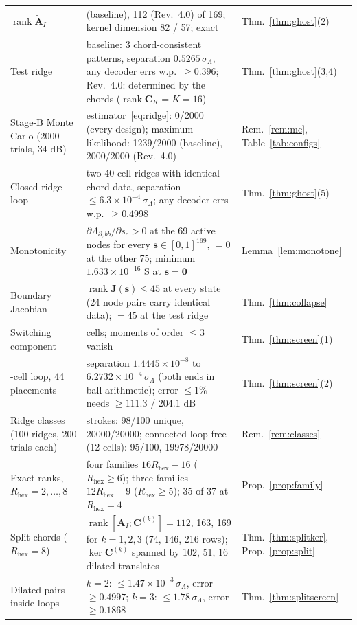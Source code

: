 \documentclass[11pt,a4paper]{article}
\theoremstyle{definition}
\theoremstyle{remark}
\begin{document}
\begin{table}[!p]
\begin{tabularx}{\textwidth}{@{}>{\raggedright\arraybackslash}p{3.6cm}>{\raggedright\arraybackslash}X>{\raggedright\arraybackslash}p{2.6cm}@{}}
$\operatorname{rank}\widetilde{\mathbf{A}}_I$ & 87 (baseline), 112 (Rev.~4.0) of 169; kernel dimension 82 / 57; exact & Thm.~\ref{thm:ghost}(2) \\
Test ridge & baseline: 3 chord-consistent patterns, separation $0.5265\,\sigma_\Lambda$, any decoder errs w.p.\ $\ge 0.396$; Rev.~4.0: determined by the chords ($\operatorname{rank}\mathbf{C}_K = K = 16$) & Thm.~\ref{thm:ghost}(3,4) \\
Stage-B Monte Carlo (2000 trials, 34 dB) & estimator~\eqref{eq:ridge}: 0/2000 (every design); maximum likelihood: 1239/2000 (baseline), 2000/2000 (Rev.~4.0) & Rem.~\ref{rem:mc}, Table~\ref{tab:configs} \\
Closed ridge loop & two 40-cell ridges with identical chord data, separation $\le 6.3\times10^{-4}\,\sigma_\Lambda$; any decoder errs w.p.\ $\ge 0.4998$ & Thm.~\ref{thm:ghost}(5) \\
Monotonicity & $\partial\Lambda_{\partial,bb}/\partial s_c>0$ at the 69 active nodes for every $\mathbf{s}\in[0,1]^{169}$, $=0$ at the other 75; minimum $1.633\times10^{-16}$ S at $\mathbf{s}=\mathbf{0}$ & Lemma~\ref{lem:monotone} \\
Boundary Jacobian & $\operatorname{rank}\mathbf{J}(\mathbf{s})\le45$ at every state (24 node pairs carry identical data); $=45$ at the test ridge & Thm.~\ref{thm:collapse} \\
Switching component & 8 cells; moments of order $\le3$ vanish & Thm.~\ref{thm:screen}(1) \\
36-cell loop, 44 placements & separation $1.4445\times10^{-8}$ to $6.2732\times10^{-4}\,\sigma_\Lambda$ (both ends in ball arithmetic); error $\le1\%$ needs $\ge111.3$ / $204.1$ dB & Thm.~\ref{thm:screen}(2) \\
Ridge classes (100 ridges, 200 trials each) & strokes: 98/100 unique, 20000/20000; connected loop-free (12 cells): 95/100, 19978/20000 & Rem.~\ref{rem:classes} \\
Exact ranks, $R_{\text{hex}}=2,\dots,8$ & four families $16R_{\text{hex}}-16$ ($R_{\text{hex}}\ge6$); three families $12R_{\text{hex}}-9$ ($R_{\text{hex}}\ge5$); 35 of 37 at $R_{\text{hex}}=4$ & Prop.~\ref{prop:family} \\
Split chords ($R_{\text{hex}}=8$) & $\operatorname{rank}[\mathbf{A}_I;\mathbf{C}^{(k)}] = 112$, 163, 169 for $k=1,2,3$ (74, 146, 216 rows); $\ker\mathbf{C}^{(k)}$ spanned by 102, 51, 16 dilated translates & Thm.~\ref{thm:splitker}, Prop.~\ref{prop:split} \\
Dilated pairs inside loops & $k=2$: $\le1.47\times10^{-3}\,\sigma_\Lambda$, error $\ge0.4997$; $k=3$: $\le1.78\,\sigma_\Lambda$, error $\ge0.1868$ & Thm.~\ref{thm:splitscreen} \\

\end{tabularx}
\end{table}
\end{document}

